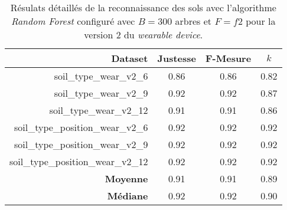 \begin{table}[H]\renewcommand{\arraystretch}{0.5}
	\centering
	\caption{Résulats détaillés de la reconnaissance des sols avec l'algorithme \textit{Random Forest} configuré avec $B=300$ arbres et $F=f2$ pour la version 2 du \textit{wearable device}.}
	\label{tab:tab:rf-300-f2-wear-v2}
	\begin{tabular}{@{}rccc@{}}
		\toprule
			\textbf{Dataset} & \textbf{Justesse} & \textbf{F-Mesure} & \textbf{$k$} \\
		\midrule
			soil\_type\_wear\_v2\_6 & 0.86 & 0.86 & 0.82 \\
			soil\_type\_wear\_v2\_9 & 0.92 & 0.92 & 0.87 \\
			soil\_type\_wear\_v2\_12 & 0.91 & 0.91 & 0.86 \\
			soil\_type\_position\_wear\_v2\_6 & 0.92 & 0.92 & 0.92 \\
			soil\_type\_position\_wear\_v2\_9 & 0.92 & 0.92 & 0.92 \\
			soil\_type\_position\_wear\_v2\_12 & 0.92 & 0.92 & 0.92 \\
			\textbf{Moyenne} & 0.91 & 0.91 & 0.89 \\
			\textbf{Médiane} & 0.92 & 0.92 & 0.90 \\
		\bottomrule
	\end{tabular}
\end{table}

